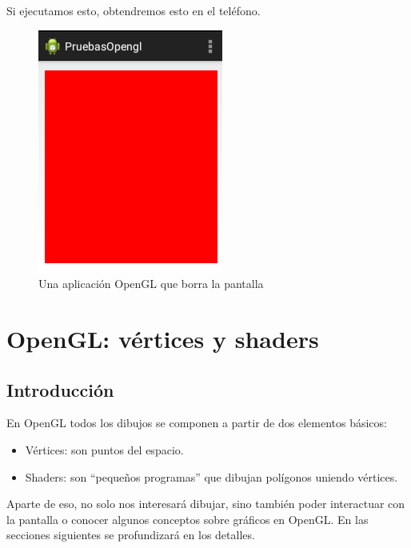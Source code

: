 \documentclass[a4paper,12pt,spanish]{sphinxmanual}
\begin{document}
Si ejecutamos esto, obtendremos esto en el teléfono.
\begin{figure}[htbp]
\centering
\capstart

\includegraphics{rojoopengl.png}
\caption{Una aplicación OpenGL que borra la pantalla}\end{figure}


\chapter{OpenGL: vértices y shaders}
\label{cap2opengl:opengl-vertices-y-shaders}\label{cap2opengl::doc}

\section{Introducción}
\label{cap2opengl:introduccion}
En OpenGL todos los dibujos se componen a partir de dos elementos básicos:
\begin{itemize}
\item {} 
Vértices: son puntos del espacio.

\item {} 
Shaders: son ``pequeños programas'' que dibujan polígonos uniendo vértices.

\end{itemize}

Aparte de eso, no solo nos interesará dibujar, sino también poder interactuar con la pantalla o conocer algunos conceptos sobre gráficos en OpenGL. En las secciones siguientes se profundizará en los detalles.
\end{document}
